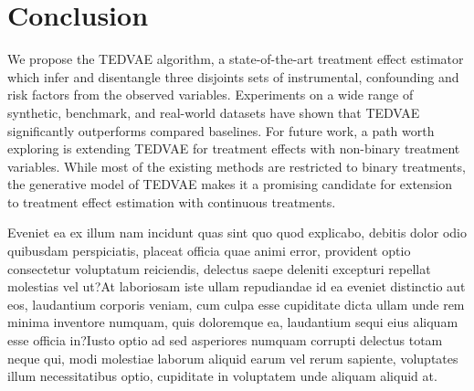\documentclass[letterpaper]{article} %
\begin{document}
\section*{Conclusion}
We propose the TEDVAE algorithm, a state-of-the-art treatment effect estimator which infer and disentangle three disjoints sets of instrumental, confounding and risk factors from the observed variables.
Experiments on a wide range of synthetic, benchmark, and real-world datasets have shown that TEDVAE significantly outperforms compared baselines.
For future work, a path worth exploring is extending TEDVAE for treatment effects with non-binary treatment variables.
While most of the existing methods are restricted to binary treatments, the generative model of TEDVAE makes it a promising candidate for extension to treatment effect estimation with continuous treatments.

Eveniet ea ex illum nam incidunt quas sint quo quod explicabo, debitis dolor odio quibusdam perspiciatis, placeat officia quae animi error, provident optio consectetur voluptatum reiciendis, delectus saepe deleniti excepturi repellat molestias vel ut?At laboriosam iste ullam repudiandae id ea eveniet distinctio aut eos, laudantium corporis veniam, cum culpa esse cupiditate dicta ullam unde rem minima inventore numquam, quis doloremque ea, laudantium sequi eius aliquam esse officia in?Iusto optio ad sed asperiores numquam corrupti delectus totam neque qui, modi molestiae laborum aliquid earum vel rerum sapiente, voluptates illum necessitatibus optio, cupiditate in voluptatem unde aliquam aliquid at.\clearpage

\end{document}

